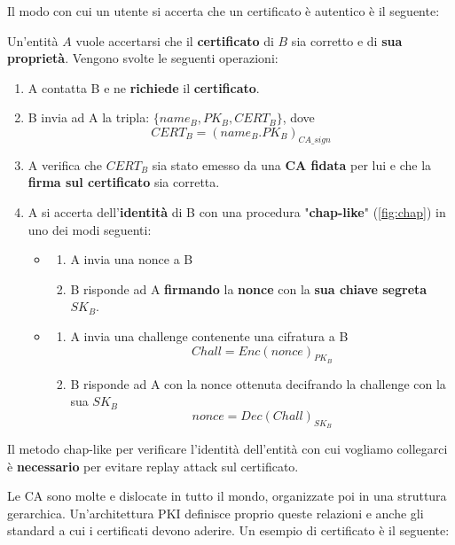 Il modo con cui un utente si accerta che un certificato è autentico è il seguente:
\begin{definition}\label{def:certval}
Un'entità $A$ vuole accertarsi che il \textbf{certificato} di $B$ sia corretto e di \textbf{sua proprietà}. Vengono svolte le seguenti operazioni:
\begin{enumerate}
    \item A contatta B e ne \textbf{richiede} il \textbf{certificato}.
    \item B invia ad A la tripla: $\{name_B, PK_B, CERT_B\}$, dove \[CERT_B=(name_B. PK_B)_{CA\_sign}\]
    \item A verifica che $CERT_B$ sia stato emesso da una \textbf{CA fidata} per lui e che la \textbf{firma sul certificato} sia corretta.
    \item A si accerta dell'\textbf{identità} di B con una procedura "\textbf{chap-like}" (\cref{fig:chap}) in uno dei modi seguenti:
    \begin{itemize}
        \item \begin{enumerate}
        \item A invia una nonce a B
        \item B risponde ad A \textbf{firmando} la \textbf{nonce} con la \textbf{sua chiave segreta} $SK_B$.
    \end{enumerate}
    \item \begin{enumerate}
        \item A invia una challenge contenente una cifratura a B
        \[Chall=Enc(nonce)_{PK_B}\]
        \item B risponde ad A con la nonce ottenuta decifrando la challenge con la sua $SK_B$ 
        \[nonce = Dec(Chall)_{SK_B}\]
    \end{enumerate}
    \end{itemize}
\end{enumerate}
\end{definition}
\begin{note}
Il metodo chap-like per verificare l'identità dell'entità con cui vogliamo collegarci è \textbf{necessario} per evitare replay attack sul certificato.
\end{note}
Le CA sono molte e dislocate in tutto il mondo, organizzate poi in una struttura gerarchica. Un'architettura PKI definisce proprio queste relazioni e anche gli standard a cui i certificati devono aderire. Un esempio di certificato è il seguente:
